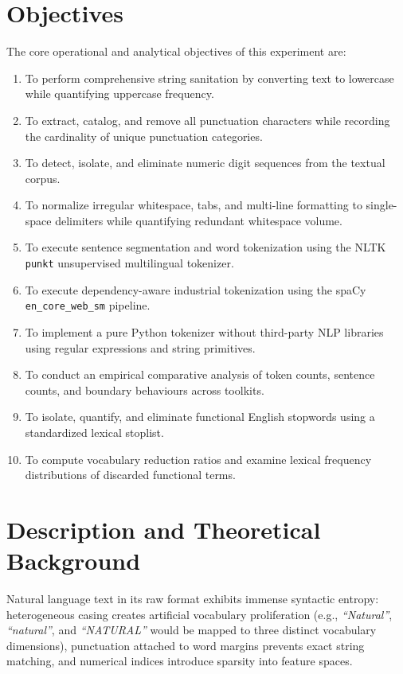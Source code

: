 \section{Objectives}
The core operational and analytical objectives of this experiment are:
\begin{enumerate}[label=\textbf{\arabic*.}]
    \item To perform comprehensive string sanitation by converting text to lowercase while quantifying uppercase frequency.
    \item To extract, catalog, and remove all punctuation characters while recording the cardinality of unique punctuation categories.
    \item To detect, isolate, and eliminate numeric digit sequences from the textual corpus.
    \item To normalize irregular whitespace, tabs, and multi-line formatting to single-space delimiters while quantifying redundant whitespace volume.
    \item To execute sentence segmentation and word tokenization using the NLTK \texttt{punkt} unsupervised multilingual tokenizer.
    \item To execute dependency-aware industrial tokenization using the spaCy \texttt{en\_core\_web\_sm} pipeline.
    \item To implement a pure Python tokenizer without third-party NLP libraries using regular expressions and string primitives.
    \item To conduct an empirical comparative analysis of token counts, sentence counts, and boundary behaviours across toolkits.
    \item To isolate, quantify, and eliminate functional English stopwords using a standardized lexical stoplist.
    \item To compute vocabulary reduction ratios and examine lexical frequency distributions of discarded functional terms.
\end{enumerate}

\section{Description and Theoretical Background}
Natural language text in its raw format exhibits immense syntactic entropy: heterogeneous casing creates artificial vocabulary proliferation (e.g., \textit{``Natural''}, \textit{``natural''}, and \textit{``NATURAL''} would be mapped to three distinct vocabulary dimensions), punctuation attached to word margins prevents exact string matching, and numerical indices introduce sparsity into feature spaces.

